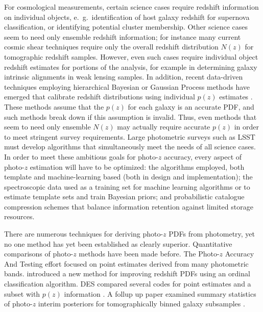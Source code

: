 For cosmological measurements, certain science cases require redshift information on individual objects, e.~g.~identification of host galaxy redshift for supernova classification, or identifying potential cluster membership.
Other science cases seem to need only ensemble redshift information; for instance many current cosmic shear techniques require only the overall redshift distribution $N(z)$ for tomographic redshift samples.  However,  even such cases require individual object redshift estimates for portions of the analysis, for example in determining galaxy intrinsic alignments in weak lensing samples.  In addition, recent data-driven techniques employing hierarchical Bayesian or Gaussian Process methods have emerged that calibrate redshift distributions using individual $p(z)$ estimates \citep[e.~g.~][]{Sanchez:2018}.  These methods assume that the $p(z)$ for each galaxy is an accurate PDF, and such methods break down if this assumption is invalid.  Thus, even methods that seem to need only ensemble $N(z)$ may actually require accurate $p(z)$ in order to meet stringent survey requirements.
Large photometric surveys such as LSST must develop algorithms that simultaneously meet the needs of all science cases.
In order to meet these ambitious goals for photo-$z$ accuracy, every aspect of photo-$z$ estimation will have to be optimized: the algorithms employed, both template and machine-learning based (both in design and implementation); the spectroscopic data used as a training set for machine learning algorithms or to estimate template sets and train Bayesian priors; and probabilistic catalogue compression schemes that balance information retention against limited storage resources.

There are numerous techniques for deriving photo-$z$ PDFs from photometry, yet no one method has yet been established as clearly superior.
Quantitative comparisons of photo-$z$ methods have been made before.
The Photo-$z$ Accuracy And Testing \citep[PHAT,][]{Hildebrandt:10} effort focused on point estimates derived from many photometric bands.  \citet{Rau:2015} introduced a new method for improving redshift PDFs using an ordinal classification algorithm.
DES compared several codes for point estimates and a subset with $p(z)$ information \citep{Sanchez:14}.  A follup up paper examined summary statistics of photo-$z$ interim posteriors for tomographically binned galaxy subsamples \citep{Bonnett:16}.  


